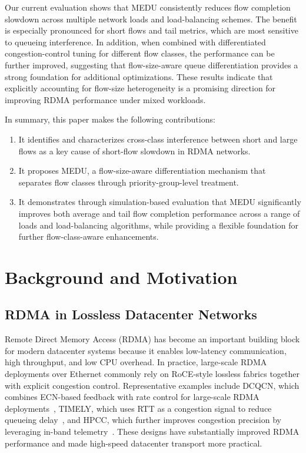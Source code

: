 \documentclass[conference]{IEEEtran}
\begin{document}
Our current evaluation shows that MEDU consistently reduces flow completion slowdown across multiple network loads and load-balancing schemes. The benefit is especially pronounced for short flows and tail metrics, which are most sensitive to queueing interference. In addition, when combined with differentiated congestion-control tuning for different flow classes, the performance can be further improved, suggesting that flow-size-aware queue differentiation provides a strong foundation for additional optimizations. These results indicate that explicitly accounting for flow-size heterogeneity is a promising direction for improving RDMA performance under mixed workloads.

In summary, this paper makes the following contributions:

\begin{enumerate}
  \item It identifies and characterizes cross-class interference between short and large flows as a key cause of short-flow slowdown in RDMA networks.
  \item It proposes MEDU, a flow-size-aware differentiation mechanism that separates flow classes through priority-group-level treatment.
  \item It demonstrates through simulation-based evaluation that MEDU significantly improves both average and tail flow completion performance across a range of loads and load-balancing algorithms, while providing a flexible foundation for further flow-class-aware enhancements.
\end{enumerate}

\section{Background and Motivation}

\subsection{RDMA in Lossless Datacenter Networks}

Remote Direct Memory Access (RDMA) has become an important building block for modern datacenter systems because it enables low-latency communication, high throughput, and low CPU overhead. In practice, large-scale RDMA deployments over Ethernet commonly rely on RoCE-style lossless fabrics together with explicit congestion control. Representative examples include DCQCN, which combines ECN-based feedback with rate control for large-scale RDMA deployments~\cite{dcqcn}, TIMELY, which uses RTT as a congestion signal to reduce queueing delay~\cite{timely}, and HPCC, which further improves congestion precision by leveraging in-band telemetry~\cite{hpcc}. These designs have substantially improved RDMA performance and made high-speed datacenter transport more practical.
\end{document}
